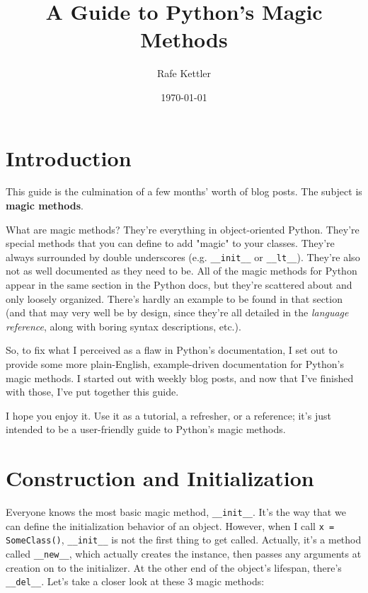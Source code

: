 \documentclass[a4paper,11pt]{article}
\title{A Guide to Python's Magic Methods}
\author{Rafe Kettler}
\date{\today}
\newcommand{\code}[1]{\texttt{#1}}
\begin{document}
\maketitle

\section{Introduction}

This guide is the culmination of a few months' worth of blog posts. The subject is \textbf{magic methods}.

What are magic methods? They're everything in object-oriented Python. They're special methods that you can define to add "magic" to your classes. They're always surrounded by double underscores (e.g. \code{__init__} or \code{__lt__}). They're also not as well documented as they need to be. All of the magic methods for Python appear in the same section in the Python docs, but they're scattered about and only loosely organized. There's hardly an example to be found in that section (and that may very well be by design, since they're all detailed in the \emph{language reference}, along with boring syntax descriptions, etc.).

So, to fix what I perceived as a flaw in Python's documentation, I set out to provide some more plain-English, example-driven documentation for Python's magic methods. I started out with weekly blog posts, and now that I've finished with those, I've put together this guide.

I hope you enjoy it. Use it as a tutorial, a refresher, or a reference; it's just intended to be a user-friendly guide to Python's magic methods.

\section{Construction and Initialization}

Everyone knows the most basic magic method, \code{__init__}. It's the way that we can define the initialization behavior of an object. However, when I call \code{x = SomeClass()}, \code{__init__} is not the first thing to get called. Actually, it's a method called \code{__new__}, which actually creates the instance, then passes any arguments at creation on to the initializer. At the other end of the object's lifespan, there's \code{__del__}. Let's take a closer look at these 3 magic methods:
\end{document}
